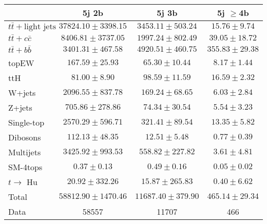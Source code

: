 \begin{table}
\begin{center}
  \begin{tabular}{ | l |  c |  c |  c | }
    \hline \hline 
     & 5j 2b  & 5j 3b  & 5j $\geq$4b  \\ 
    \hline 
     $t\bar{t}+\text{light jets}$  &   $ 37824.10 \pm 3398.15 $ &   $ 3453.11 \pm 503.24 $ &   $ 15.76 \pm 9.74 $ \\ 
     $t\bar{t}+c\bar{c}$  &   $ 8406.81 \pm 3737.05 $ &   $ 1997.24 \pm 802.49 $ &   $ 39.05 \pm 18.72 $ \\ 
     $t\bar{t}+b\bar{b}$  &   $ 3401.31 \pm 467.58 $ &   $ 4920.51 \pm 460.75 $ &   $ 355.83 \pm 29.38 $ \\ 
    topEW  &   $ 167.59 \pm 25.93 $ &   $ 65.30 \pm 10.44 $ &   $ 8.17 \pm 1.44 $ \\ 
    ttH  &   $ 81.00 \pm 8.90 $ &   $ 98.59 \pm 11.59 $ &   $ 16.59 \pm 2.32 $ \\ 
    W+jets  &   $ 2096.55 \pm 837.78 $ &   $ 169.24 \pm 68.65 $ &   $ 6.03 \pm 2.84 $ \\ 
    Z+jets  &   $ 705.86 \pm 278.86 $ &   $ 74.34 \pm 30.54 $ &   $ 5.54 \pm 3.23 $ \\ 
    Single-top  &   $ 2570.29 \pm 596.71 $ &   $ 321.41 \pm 89.54 $ &   $ 13.35 \pm 5.82 $ \\ 
    Dibosons  &   $ 112.13 \pm 48.35 $ &   $ 12.51 \pm 5.48 $ &   $ 0.77 \pm 0.39 $ \\ 
    Multijets  &   $ 3425.92 \pm 993.53 $ &   $ 558.82 \pm 227.82 $ &   $ 3.61 \pm 4.81 $ \\ 
    SM-4tops  &   $ 0.37 \pm 0.13 $ &   $ 0.49 \pm 0.16 $ &   $ 0.05 \pm 0.02 $ \\ 
     $t\rightarrow$ Hu  &   $ 20.92 \pm 332.26 $ &   $ 15.87 \pm 265.83 $ &   $ 0.40 \pm 6.62 $ \\ 
    Total  &   $ 58812.90 \pm 1470.46 $ &   $ 11687.40 \pm 379.90 $ &   $ 465.14 \pm 29.34 $ \\ 
    \hline 
    Data  & 58557  & 11707  & 466  \\ 
    \hline \hline 
  \end{tabular} 



\end{center}
\end{table}
